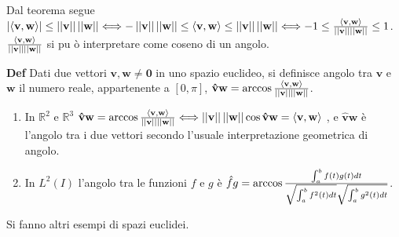 \documentclass{article}
\begin{document}
Dal teorema segue $\left\vert \langle \mathbf{v,w\rangle }\right\vert \leq
\left\vert \left\vert \mathbf{v}\right\vert \right\vert \left\vert
\left\vert \mathbf{w}\right\vert \right\vert \Longleftrightarrow -\left\vert
\left\vert \mathbf{v}\right\vert \right\vert \left\vert \left\vert \mathbf{w}%
\right\vert \right\vert \leq \langle \mathbf{v,w\rangle }\leq \left\vert
\left\vert \mathbf{v}\right\vert \right\vert \left\vert \left\vert \mathbf{w}%
\right\vert \right\vert \Longleftrightarrow -1\leq \frac{\langle \mathbf{%
v,w\rangle }}{\left\vert \left\vert \mathbf{v}\right\vert \right\vert
\left\vert \left\vert \mathbf{w}\right\vert \right\vert }\leq 1$. $\frac{%
\langle \mathbf{v,w\rangle }}{\left\vert \left\vert \mathbf{v}\right\vert
\right\vert \left\vert \left\vert \mathbf{w}\right\vert \right\vert }$ si pu%
\`{o} interpretare come coseno di un angolo.

\textbf{Def} Dati due vettori $\mathbf{v,w\neq 0}$ in uno spazio euclideo,
si definisce angolo tra $\mathbf{v}$ e $\mathbf{w}$ il numero reale,
appartenente a $\left[ 0,\pi \right] $, $\mathbf{\hat{v}w}=\arccos \frac{%
\langle \mathbf{v,w\rangle }}{\left\vert \left\vert \mathbf{v}\right\vert
\right\vert \left\vert \left\vert \mathbf{w}\right\vert \right\vert }$.

\begin{enumerate}
\item In $%
\mathbb{R}
^{2}$ e $%
\mathbb{R}
^{3}$ $\mathbf{\hat{v}w}=\arccos \frac{\langle \mathbf{v,w\rangle }}{%
\left\vert \left\vert \mathbf{v}\right\vert \right\vert \left\vert
\left\vert \mathbf{w}\right\vert \right\vert }\Longleftrightarrow \left\vert
\left\vert \mathbf{v}\right\vert \right\vert \left\vert \left\vert \mathbf{w}%
\right\vert \right\vert \cos \mathbf{\hat{v}w}=\langle \mathbf{v,w\rangle }$%
, e $\mathbf{\hat{v}w}$ \`{e} l'angolo tra i due vettori secondo l'usuale
interpretazione geometrica di angolo.

\item In $L^{2}\left( I\right) $ l'angolo tra le funzioni $f$ e $g$ \`{e} $%
\hat{f}g=\arccos \frac{\int_{a}^{b}f\left( t\right) g\left( t\right) dt}{%
\sqrt{\int_{a}^{b}f^{2}\left( t\right) dt}\sqrt{\int_{a}^{b}g^{2}\left(
t\right) dt}}$.
\end{enumerate}

Si fanno altri esempi di spazi euclidei.
\end{document}

